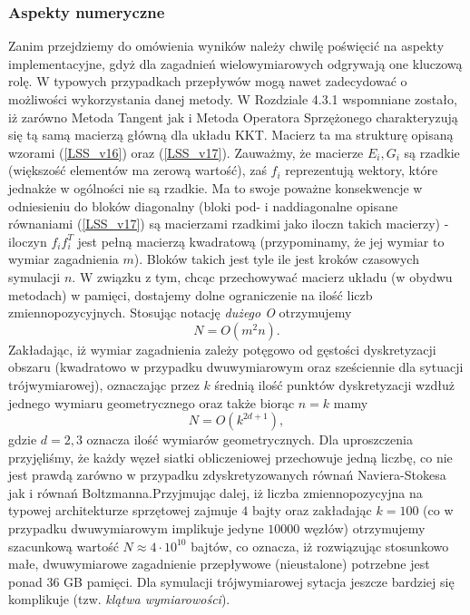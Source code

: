 \documentclass[12pt]{article}
\begin{document}
\subsubsection{Aspekty numeryczne}
Zanim przejdziemy do omówienia wyników należy chwilę poświęcić na aspekty implementacyjne, gdyż dla zagadnień wielowymiarowych odgrywają one kluczową rolę. W typowych przypadkach przepływów mogą nawet zadecydować o możliwości wykorzystania danej metody.\newline
W Rozdziale 4.3.1 wspomniane zostało, iż zarówno Metoda Tangent jak i Metoda Operatora Sprzężonego charakteryzują się tą samą macierzą główną dla układu KKT. Macierz ta ma strukturę opisaną wzorami (\ref{LSS_v16}) oraz (\ref{LSS_v17}). Zauważmy, że macierze $E_{i}, G_{i}$ są rzadkie (większość elementów ma zerową wartość), zaś $ f_{i} $ reprezentują wektory, które jednakże w ogólności nie są rzadkie. Ma to swoje poważne konsekwencje w odniesieniu do bloków diagonalny (bloki pod- i naddiagonalne opisane równaniami (\ref{LSS_v17}) są macierzami rzadkimi jako iloczn takich macierzy) - iloczyn $ f_{i}f_{i}^{T} $ jest  pełną macierzą kwadratową (przypominamy, że jej wymiar to wymiar zagadnienia $ m $). Bloków takich jest tyle ile jest kroków czasowych symulacji $ n $. W związku z tym, chcąc przechowywać macierz układu (w obydwu metodach) w pamięci, dostajemy dolne ograniczenie na ilość liczb zmiennopozycyjnych. Stosując notację \textit{dużego O} otrzymujemy
\begin{equation}
 N = O(m^{2}n).
\label{no}
\end{equation}
Zakładając, iż wymiar zagadnienia zależy potęgowo od gęstości dyskretyzacji obszaru (kwadratowo w przypadku dwuwymiarowym oraz sześciennie dla sytuacji trójwymiarowej), oznaczając przez $ k $ średnią ilość punktów dyskretyzacji wzdłuż jednego wymiaru geometrycznego oraz także biorąc $ n = k $ mamy
\begin{equation}
N = O(k^{2d+1}),
\label{no_v2}
\end{equation}
gdzie $ d = 2, 3$ oznacza ilość wymiarów geometrycznych. Dla uproszczenia przyjęliśmy, że każdy węzeł siatki obliczeniowej przechowuje jedną liczbę, co nie jest prawdą zarówno w przypadku zdyskretyzowanych równań Naviera-Stokesa jak i równań Boltzmanna.\newline Przyjmując dalej, iż liczba zmiennopozycyjna na typowej architekturze sprzętowej zajmuje $ 4 $ bajty oraz zakładając $ k=100 $ (co w przypadku dwuwymiarowym implikuje jedyne $ 10 000 $ węzłów) otrzymujemy szacunkową wartość $ N \approx 4\cdot 10^{10}$ bajtów, co oznacza, iż rozwiązując stosunkowo małe, dwuwymiarowe zagadnienie przepływowe (nieustalone) potrzebne jest ponad $ 36 $ GB pamięci. Dla symulacji trójwymiarowej sytacja jeszcze bardziej się komplikuje (tzw. \textit{klątwa wymiarowości}).\newline
\end{document}

